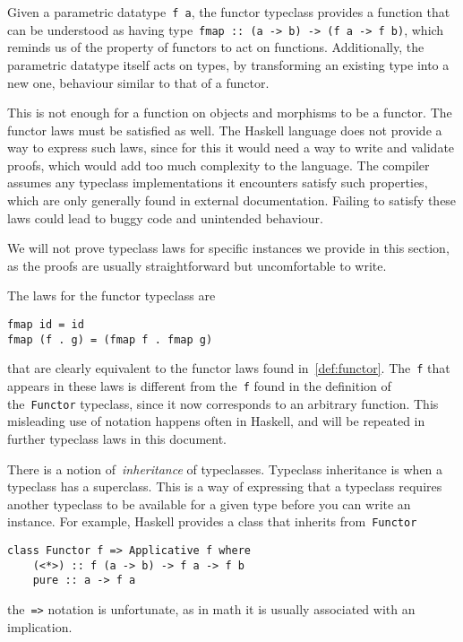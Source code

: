 \documentclass[a4paper]{article}
\theoremstyle{plain}
\theoremstyle{definition}
\begin{document}
Given a parametric datatype~\texttt{f a}, the functor typeclass
provides a function that can be understood as having
type~\texttt{fmap :: (a -> b) -> (f a -> f b)}, which reminds us of
the property of functors to act on functions. Additionally, the parametric
datatype itself acts on types, by transforming an existing type into a new one,
behaviour similar to that of a functor.

This is not enough for a function on objects and morphisms to be a functor. The
functor laws must be satisfied as well. The Haskell language does not provide a
way to express such laws, since for this it would need a way to write and
validate proofs, which would add too much complexity to the language. The
compiler assumes any typeclass implementations it encounters satisfy such
properties, which are only generally found in external documentation. Failing to
satisfy these laws could lead to buggy code and unintended behaviour.

We will not prove typeclass laws for specific instances we provide in this
section, as the proofs are usually straightforward but uncomfortable to write.

The laws for the functor typeclass are
\begin{verbatim}
fmap id = id
fmap (f . g) = (fmap f . fmap g)
\end{verbatim}
that are clearly equivalent to the functor laws found in~\ref{def:functor}.
The~\texttt{f} that appears in these laws is different from
the~\texttt{f} found in the definition of
the~\texttt{Functor} typeclass, since it now corresponds to an
arbitrary function. This misleading use of notation happens often in Haskell,
and will be repeated in further typeclass laws in this document.

There is a notion of~\emph{inheritance} of typeclasses. Typeclass inheritance is
when a typeclass has a superclass. This is a way of expressing that a typeclass
requires another typeclass to be available for a given type before you can write
an instance. For example, Haskell provides a class that inherits
from~\texttt{Functor}
\begin{verbatim}
class Functor f => Applicative f where
    (<*>) :: f (a -> b) -> f a -> f b
    pure :: a -> f a
\end{verbatim}
the~\texttt{=>} notation is unfortunate, as in math it is usually
associated with an implication.
\end{document}
